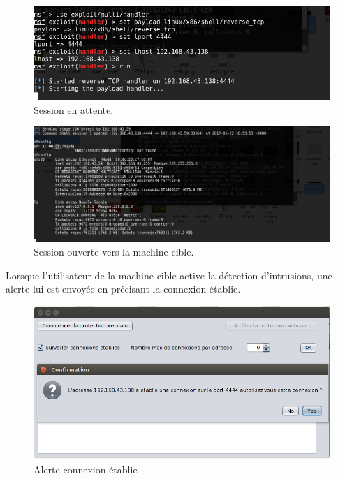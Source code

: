 		\begin{figure}[H]
					\begin{center}
					    \includegraphics[scale=0.5]{images/session_listened.png}
					\end{center}
					\caption{Session en attente.}
					\label{Session en attente}
				    \end{figure}
		  \begin{figure}[H]
					\begin{center}
					    \includegraphics[scale=0.5]{images/session_opened.png}
					\end{center}
					\caption{Session ouverte vers la machine cible.}
					\label{Session ouverte}
				    \end{figure}
				    
Lorsque l'utilisateur de la machine cible active la détection d'intrusions, une alerte lui est envoyée en précisant la connexion établie.
 \begin{figure}[H]
					\begin{center}
					    \includegraphics[scale=0.5]{images/session_detected.png}
					\end{center}
					\caption{Alerte connexion établie}
					\label{Connexion établie }
				    \end{figure}
				    
